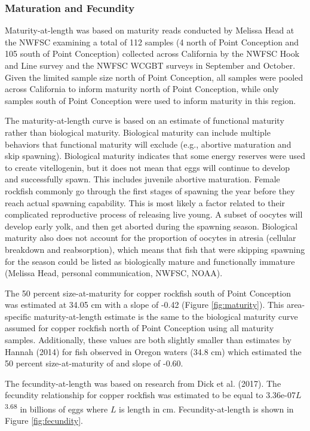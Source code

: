 \documentclass[11pt,
  english,
  letterpaper,
]{article}
\begin{document}
\hypertarget{maturation-and-fecundity}{%
\subsubsection{Maturation and Fecundity}\label{maturation-and-fecundity}}

Maturity-at-length was based on maturity reads conducted by Melissa Head at the NWFSC examining a total of 112 samples (4 north of Point Conception and 105 south of Point Conception) collected across California by the NWFSC Hook and Line survey and the NWFSC WCGBT surveys in September and October. Given the limited sample size north of Point Conception, all samples were pooled across California to inform maturity north of Point Conception, while only samples south of Point Conception were used to inform maturity in this region.

The maturity-at-length curve is based on an estimate of functional maturity rather than biological maturity. Biological maturity can include multiple behaviors that functional maturity will exclude (e.g., abortive maturation and skip spawning). Biological maturity indicates that some energy reserves were used to create vitellogenin, but it does not mean that eggs will continue to develop and successfully spawn. This includes juvenile abortive maturation. Female rockfish commonly go through the first stages of spawning the year before they reach actual spawning capability. This is most likely a factor related to their complicated reproductive process of releasing live young. A subset of oocytes will develop early yolk, and then get aborted during the spawning season. Biological maturity also does not account for the proportion of oocytes in atresia (cellular breakdown and reabsorption), which means that fish that were skipping spawning for the season could be listed as biologically mature and functionally immature (Melissa Head, personal communication, NWFSC, NOAA).

The 50 percent size-at-maturity for copper rockfish south of Point Conception was estimated at 34.05 cm with a slope of -0.42 (Figure \ref{fig:maturity}). This area-specific maturity-at-length estimate is the same to the biological maturity curve assumed for copper rockfish north of Point Conception using all maturity samples. Additionally, these values are both slightly smaller than estimates by Hannah (2014) for fish observed in Oregon waters (34.8 cm) which estimated the 50 percent size-at-maturity of and slope of -0.60.

The fecundity-at-length was based on research from Dick et al. (2017). The fecundity relationship for copper rockfish was estimated to be equal to 3.36e-07\(L\)\textsuperscript{3.68} in billions of eggs where \(L\) is length in cm. Fecundity-at-length is shown in Figure \ref{fig:fecundity}.
\end{document}
